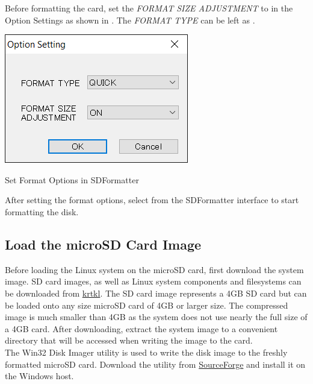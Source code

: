 \newpage
Before formatting the card, set the \textit{FORMAT SIZE ADJUSTMENT} to  in the Option Settings as shown in . The \textit{FORMAT TYPE} can be left as . \\


\begin{marginfigure}
	\centering
	\includegraphics{images/SDFormatter_Option_Setting.png}
	\caption[Set Format Options in SDFormatter]{Set Format Options in SDFormatter}
	\label{fig:sdformatoption}
\end{marginfigure}


After setting the format options, select  from the SDFormatter interface to start formatting the disk.





\subsection{Load the microSD Card Image}

Before loading the Linux system on the microSD card, first download the system image. SD card images, as well as Linux system components and filesystems can be downloaded from \href{http://krtkl.com/downloads/}{krtkl}. The SD card image represents a 4GB SD card but can be loaded onto any size microSD card of 4GB or larger size. The compressed image is much smaller than 4GB as the system does not use nearly the full size of a 4GB card. After downloading, extract the system image to a convenient directory that will be accessed when writing the image to the card. \\

The Win32 Disk Imager utility is used to write the disk image to the freshly formatted microSD card. Download the utility from \href{http://sourceforge.net/projects/win32diskimager}{SourceForge} and install it on the Windows host. \\

